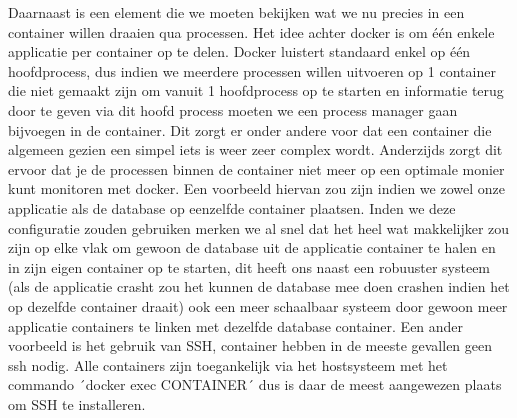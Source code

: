 Daarnaast is een element die we moeten bekijken wat we nu precies in een container willen draaien qua processen. Het idee achter docker is om één enkele applicatie per container op te delen. Docker luistert standaard enkel op één hoofdprocess, dus indien we meerdere processen willen uitvoeren op 1 container die niet gemaakt zijn om vanuit 1 hoofdprocess op te starten en informatie terug door te geven via dit hoofd process moeten we een process manager gaan bijvoegen in de container. Dit zorgt er onder andere voor dat een container die algemeen gezien een simpel iets is weer zeer complex wordt. Anderzijds zorgt dit ervoor dat je de processen binnen de container niet meer op een optimale monier kunt monitoren met docker. Een voorbeeld hiervan zou zijn indien we zowel onze applicatie als de database op eenzelfde container plaatsen. Inden we deze configuratie zouden gebruiken merken we al snel dat het heel wat makkelijker zou zijn op elke vlak om gewoon de database uit de applicatie container te halen en in zijn eigen container op te starten, dit heeft ons naast een robuuster systeem (als de applicatie crasht zou het kunnen de database mee doen crashen indien het op dezelfde container draait) ook een meer schaalbaar systeem door gewoon meer applicatie containers te linken met dezelfde database container. Een ander voorbeeld is het gebruik van SSH, container hebben in de meeste gevallen geen ssh nodig. Alle containers zijn toegankelijk via het hostsysteem met het commando ´docker exec CONTAINER´ dus is daar de meest aangewezen plaats om SSH te installeren.
